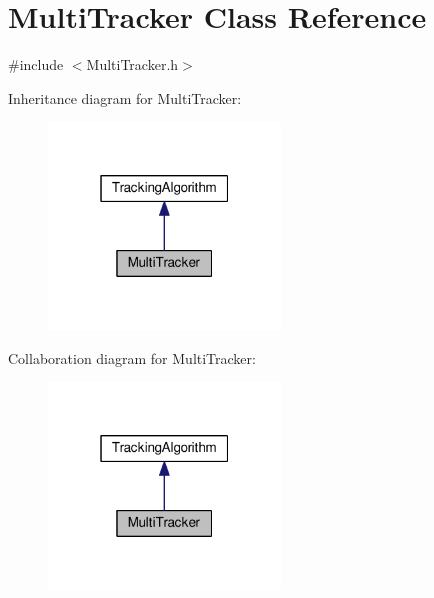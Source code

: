 \hypertarget{class_multi_tracker}{}\section{Multi\+Tracker Class Reference}
\label{class_multi_tracker}


{\ttfamily \#include $<$Multi\+Tracker.\+h$>$}



Inheritance diagram for Multi\+Tracker\+:\nopagebreak
\begin{figure}[H]
\begin{center}
\leavevmode
\includegraphics[width=175pt]{class_multi_tracker__inherit__graph}
\end{center}
\end{figure}


Collaboration diagram for Multi\+Tracker\+:\nopagebreak
\begin{figure}[H]
\begin{center}
\leavevmode
\includegraphics[width=175pt]{class_multi_tracker__coll__graph}
\end{center}
\end{figure}
